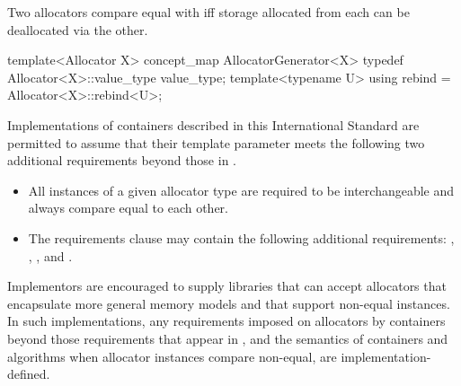 \documentclass[american,twoside]{book}
\begin{document}
\pnum
Two allocators  compare equal with \tcode{==}
iff storage allocated from each can be deallocated via the other.

\pnum {}
\color{addclr}
\begin{itemdecl}
template<Allocator X>
concept_map AllocatorGenerator<X> {
  typedef Allocator<X>::value_type value_type;
  template<typename U> using rebind = Allocator<X>::rebind<U>;
}
\end{itemdecl}
\color{black}

\pnum
Implementations of containers described in this International Standard
are permitted to assume that their  template parameter meets
the following two additional requirements beyond those in
.

\begin{itemize}
\item
All instances of a given allocator type are required to be interchangeable
and always compare equal to each other.
\item
{} \color{addclr}The
requirements clause may contain the following additional requirements: 
, , , and
.
\end{itemize}

\pnum
Implementors are encouraged to supply libraries that can accept allocators
that encapsulate more general memory models and that support non-equal
instances.
In such implementations, any requirements imposed on allocators
by containers beyond those requirements that appear in
, and the
semantics of containers and algorithms when allocator instances compare
non-equal, are implementation-defined.
\end{document}
